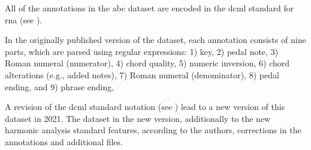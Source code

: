 
All of the annotations in the \gls{abc} dataset are encoded
in the \gls{dcml} standard for \gls{rna} (see
).


In the originally published version of the dataset, each
annotation consists of nine parts, which are parsed using
regular expressions: 1) key, 2) pedal note, 3) Roman numeral
(numerator), 4) chord quality, 5) numeric inversion, 6)
chord alterations (e.g., added notes), 7) Roman numeral
(denominator), 8) pedal ending, and 9) phrase ending,


A revision of the \gls{dcml} standard notation (see
) lead to a new version of this
dataset in 2021. The dataset in the new version,
additionally to the new harmonic analysis standard features,
according to the authors, corrections in the annotations and
additional files.